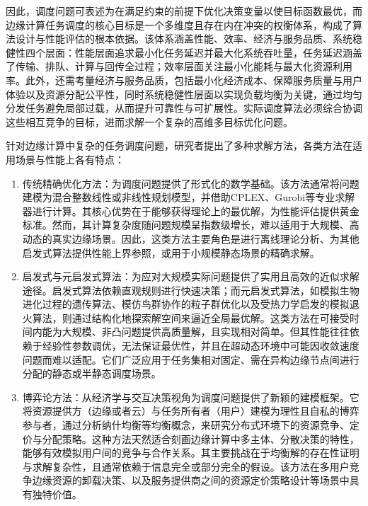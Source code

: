 因此，调度问题可表述为在满足约束的前提下优化决策变量以使目标函数最优，而边缘计算任务调度的核心目标是一个多维度且存在内在冲突的权衡体系，构成了算法设计与性能评估的根本依据\cite{9519636}。该体系涵盖性能、效率、经济与服务品质、系统稳健性四个层面：性能层面追求最小化任务延迟并最大化系统吞吐量，任务延迟涵盖了传输、排队、计算与回传全过程；效率层面关注最小化能耗与最大化资源利用率。此外，还需考量经济与服务品质，包括最小化经济成本、保障服务质量与用户体验以及资源分配公平性，同时系统稳健性层面以实现负载均衡为关键，通过均匀分发任务避免局部过载，从而提升可靠性与可扩展性。实际调度算法必须综合协调这些相互竞争的目标，进而求解一个复杂的高维多目标优化问题。

针对边缘计算中复杂的任务调度问题，研究者提出了多种求解方法，各类方法在适用场景与性能上各有特点：

\begin{enumerate}[topsep = 0 pt, itemsep= 0 pt, parsep=0pt, partopsep=0pt, leftmargin=0pt, itemindent=48pt, labelsep=0pt, listparindent=24pt, label=（\arabic*）]
    \item 传统精确优化方法\cite{7879258,9475471}：为调度问题提供了形式化的数学基础。该方法通常将问题建模为混合整数线性或非线性规划模型，并借助CPLEX、Gurobi等专业求解器进行计算。其核心优势在于能够获得理论上的最优解，为性能评估提供黄金标准。然而，其计算复杂度随问题规模呈指数级增长，难以适用于大规模、高动态的真实边缘场景。因此，这类方法主要角色是进行离线理论分析、为其他启发式算法提供性能上界参照，或用于小规模静态场景的精确求解。
    \item 启发式与元启发式算法\cite{MATERWALA2022205,WANG2022109164,8811603,8981986}：为应对大规模实际问题提供了实用且高效的近似求解途径。启发式算法依赖直观规则进行快速决策；而元启发式算法，如模拟生物进化过程的遗传算法、模仿鸟群协作的粒子群优化以及受热力学启发的模拟退火算法，则通过结构化地探索解空间来逼近全局最优解。这类方法在可接受时间内能为大规模、非凸问题提供高质量解，且实现相对简单。但其性能往往依赖于经验性参数调优，无法保证最优性，并且在超动态环境中可能因收敛速度问题而难以适配。它们广泛应用于任务集相对固定、需在异构边缘节点间进行分配的静态或半静态调度场景。
    \item 博弈论方法\cite{XU2022107624,8931659}：从经济学与交互决策视角为调度问题提供了新颖的建模框架。它将资源提供方（边缘或者云）与任务所有者（用户）建模为理性且自私的博弈参与者，通过分析纳什均衡等均衡概念，来研究分布式环境下的资源竞争、定价与分配策略。这种方法天然适合刻画边缘计算中多主体、分散决策的特性，能够有效模拟用户间的竞争与合作关系。其主要挑战在于均衡解的存在性证明与求解复杂性，且通常依赖于信息完全或部分完全的假设。该方法在多用户竞争边缘资源的卸载决策、以及服务提供商之间的资源定价策略设计等场景中具有独特价值。

\end{enumerate}
